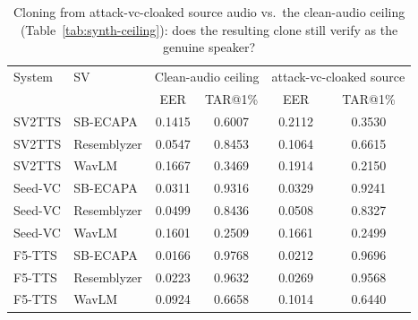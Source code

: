 \documentclass[11pt]{article}
\begin{document}
\begin{table}[H]
\centering
\caption{Cloning from attack-vc-cloaked source audio vs.\ the
clean-audio ceiling (Table~\ref{tab:synth-ceiling}): does the resulting
clone still verify as the genuine speaker?}
\label{tab:protective-efficacy-attackvc}
\begin{tabular}{llcccc}
\toprule
System & SV & \multicolumn{2}{c}{Clean-audio ceiling} & \multicolumn{2}{c}{attack-vc-cloaked source} \\
       &    & EER & TAR@1\% & EER & TAR@1\% \\
\midrule
SV2TTS   & SB-ECAPA    & 0.1415 & 0.6007 & 0.2112 & 0.3530 \\
SV2TTS   & Resemblyzer & 0.0547 & 0.8453 & 0.1064 & 0.6615 \\
SV2TTS   & WavLM       & 0.1667 & 0.3469 & 0.1914 & 0.2150 \\
\addlinespace
Seed-VC  & SB-ECAPA    & 0.0311 & 0.9316 & 0.0329 & 0.9241 \\
Seed-VC  & Resemblyzer & 0.0499 & 0.8436 & 0.0508 & 0.8327 \\
Seed-VC  & WavLM       & 0.1601 & 0.2509 & 0.1661 & 0.2499 \\
\addlinespace
F5-TTS   & SB-ECAPA    & 0.0166 & 0.9768 & 0.0212 & 0.9696 \\
F5-TTS   & Resemblyzer & 0.0223 & 0.9632 & 0.0269 & 0.9568 \\
F5-TTS   & WavLM       & 0.0924 & 0.6658 & 0.1014 & 0.6440 \\
\bottomrule
\end{tabular}
\end{table}
\end{document}
